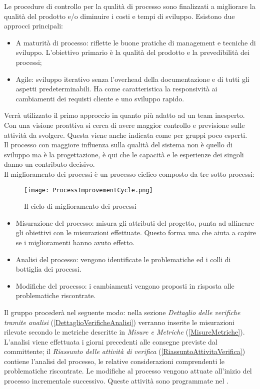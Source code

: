 	Le procedure di controllo per la qualità di processo sono finalizzati a migliorare la qualità del prodotto e/o diminuire i costi e tempi di sviluppo. Esistono due approcci principali:
	\begin{itemize}
		\item A maturità di processo: riflette le buone pratiche di management e tecniche di sviluppo. L'obiettivo primario è la qualità del prodotto e la prevedibilità dei processi;
		\item Agile: sviluppo iterativo senza l'overhead della documentazione e di tutti gli aspetti predeterminabili. Ha come caratteristica la responsività ai cambiamenti dei requisti cliente e uno sviluppo rapido.
	\end{itemize}

	Verrà utilizzato il primo approccio in quanto più adatto ad un team inesperto. Con una visione proattiva si cerca di avere maggior controllo e previsione sulle attività da svolgere. Questa viene anche indicata come  per gruppi poco esperti.\\
	Il processo con maggiore influenza sulla qualità del sistema non è quello di sviluppo ma è la progettazione, è qui che le capacità e le esperienze dei singoli danno un contributo decisivo.\\
	Il miglioramento dei processi è un processo ciclico composto da tre sotto processi:
	
	\begin{figure}[h]
	\centering \texttt{[image: ProcessImprovementCycle.png]}
	\caption{Il ciclo di miglioramento dei processi}
	\end{figure}

	\begin{itemize}
		\item Misurazione del processo: misura gli attributi del progetto, punta ad allineare gli obiettivi con le misurazioni effettuate. Questo forma una  che aiuta a capire se i miglioramenti hanno avuto effetto.
		\item Analisi del processo: vengono identificate le problematiche ed i colli di bottiglia dei processi.
		\item Modifiche del processo: i cambiamenti vengono proposti in risposta alle problematiche riscontrate.
	\end{itemize}
	
	Il gruppo procederà nel seguente modo: nella sezione \emph{Dettaglio delle verifiche tramite analisi} (\ref{DettaglioVerificheAnalisi}) verranno inserite le misurazioni rilevate secondo le metriche descritte in \emph{Misure e Metriche} (\ref{MisureMetriche}). L'analisi viene effettuata i giorni precedenti alle consegne previste dal committente; il \emph{Riassunto delle attività di verifica} (\ref{RiassuntoAttivitaVerifica}) contiene l'analisi del processo, le relative considerazioni  comprendenti le problematiche riscontrate.
	Le modifiche al processo vengono attuate all'inizio del processo incrementale successivo. Queste attività sono programmate nel \PianoDiProgetto.
	
